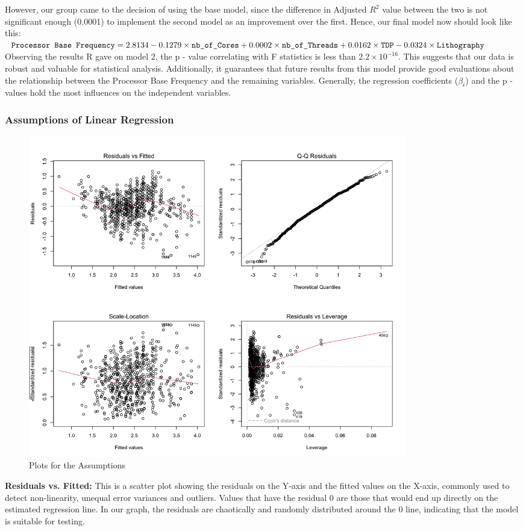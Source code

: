 However, our group came to the decision of using the base model, since the difference in Adjusted $R^2$ value between the two is not significant enough (0.0001) to implement the second model as an improvement over the first. Hence, our final model now should look like this:\\

$\text{\texttt{Processor Base Frequency}} = 2.8134 - 0.1279 \times \text{\texttt{nb\_of\_Cores}} + 0.0002 \times \text{\texttt{nb\_of\_Threads}} + 0.0162 \times \text{\texttt{TDP}} - 0.0324 \times \text{\texttt{Lithography}}$ \\

Observing the results R gave on model 2, the p - value correlating with F statistics is less than $2.2 \times 10^{-16}$. This suggests that our data is robust and valuable for statistical analysis. Additionally, it guarantees that future results from this model provide good evaluations about the relationship between the Processor Base Frequency and the remaining variables. Generally, the regression coefficients ($\beta_i$) and the p - values hold the most influences on the independent variables. 

\subsubsection{Assumptions of Linear Regression}

\begin{figure}[H]
    \centering
    \includegraphics[width=0.8\textwidth]{graphics/assumption_graph.png}
    \caption{Plots for the Assumptions}
\end{figure}

\textbf{Residuals vs. Fitted:} This is a scatter plot showing the residuals on the Y-axis and the fitted values on the X-axis, commonly used to detect non-linearity, unequal error variances and outliers. Values that have the residual 0 are those that would end up directly on the estimated regression line. In our graph, the residuals are chaotically and randomly distributed around the 0 line, indicating that the model is suitable for testing. \\

